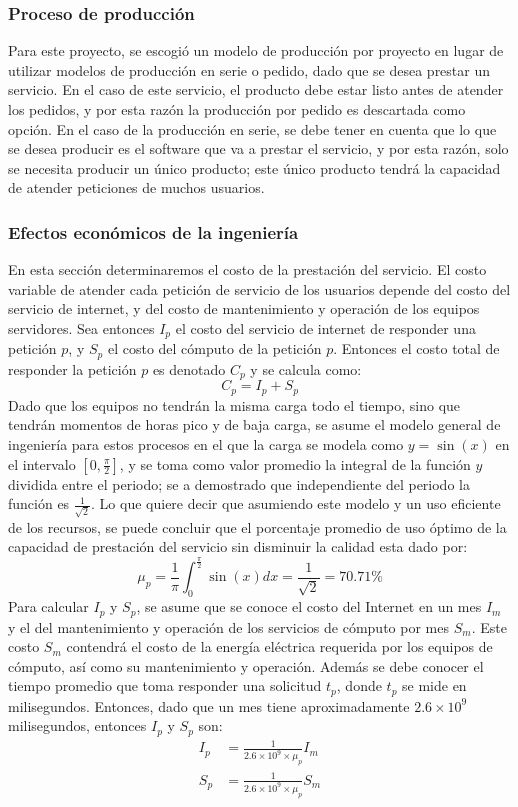 \documentclass[a4paper, 12pt, oneside]{article}
\begin{document}
	\subsubsection{Proceso de producción}
	Para este proyecto, se escogió un modelo de producción por proyecto en lugar de utilizar modelos de producción en serie o pedido, dado que se desea prestar un servicio. En el caso de este servicio, el producto debe estar listo antes de atender los pedidos, y por esta razón la producción por pedido es descartada como opción. En el caso de la producción en serie, se debe tener en cuenta que lo que se desea producir es el software que va a prestar el servicio, y por esta razón, solo se necesita producir un único producto; este único producto tendrá la capacidad de atender peticiones de muchos usuarios.

	\subsubsection{Efectos económicos de la ingeniería}
	En esta sección determinaremos el costo de la prestación del servicio. El costo variable de atender cada petición de servicio de los usuarios depende del costo del servicio de internet, y del costo de mantenimiento y operación de los equipos servidores.\newline
	Sea entonces $I_p$ el costo del servicio de internet de responder una petición $p$, y $S_p$ el costo del cómputo de la petición $p$. Entonces el costo total de responder la petición $p$ es denotado $C_p$ y se calcula como:
	\begin{equation}
		C_p = I_p + S_p
		\label{eq:opCost}
	\end{equation}
	Dado que los equipos no tendrán la misma carga todo el tiempo, sino que tendrán momentos de horas pico y de baja carga, se asume el modelo general de ingeniería para estos procesos en el que la carga se modela como $y=\sin(x)$ en el intervalo $[0,\frac{\pi}{2}]$, y se toma como valor promedio la integral de la función $y$ dividida entre el periodo; se a demostrado que independiente del periodo la función es $\frac{1}{\sqrt{2}}$. Lo que quiere decir que asumiendo este modelo y un uso eficiente de los recursos, se puede concluir que el porcentaje promedio de uso óptimo de la capacidad de prestación del servicio sin disminuir la calidad esta dado por:
	\[ \mu_p=\frac{1}{\pi}\int_0^{\frac{\pi}{2}}{\sin(x)dx} = \frac{1}{\sqrt{2}} = 70.71\% \]
	Para calcular $I_p$ y $S_p$, se asume que se conoce el costo del Internet en un mes $I_m$ y el del mantenimiento y operación de los servicios de cómputo por mes $S_m$. Este costo $S_m$ contendrá el costo de la energía eléctrica requerida por los equipos de cómputo, así como su mantenimiento y operación. Además se debe conocer el tiempo promedio que toma responder una solicitud $t_p$, donde $t_p$ se mide en milisegundos. Entonces, dado que un mes tiene aproximadamente $2.6 \times 10^9$ milisegundos, entonces $I_p$ y $S_p$ son:
	\begin{align}
		I_p &= \frac{1}{2.6 \times 10^9 \times \mu_p}I_m \\
		S_p &= \frac{1}{2.6 \times 10^9 \times \mu_p}S_m
	\end{align}
\end{document}
